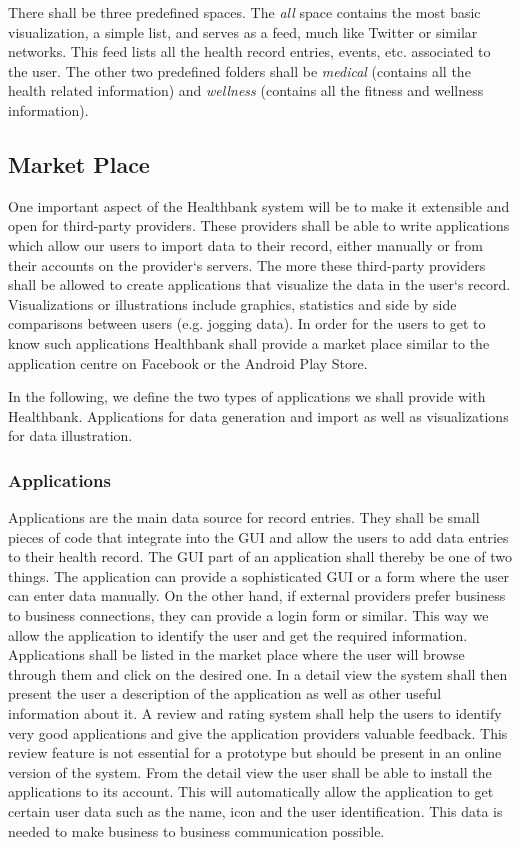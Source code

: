 There shall be three predefined spaces. The \emph{all} space contains the most basic visualization, a simple list, and serves as a feed, much like Twitter or similar networks. This feed lists all the health record entries, events, etc. associated to the user. The other two predefined folders shall be \emph{medical} (contains all the health related information) and \emph{wellness} (contains all the fitness and wellness information). 


\subsection{Market Place} 

One important aspect of the Healthbank system will be to make it extensible and open for third-party providers. These providers shall be able to write applications which allow our users to import data to their record, either manually or from their accounts on the provider`s servers. The more these third-party providers shall be allowed to create applications that visualize the data in the user`s record. Visualizations or illustrations include graphics, statistics and side by side comparisons between users (e.g. jogging data). In order for the users to get to know such applications Healthbank shall provide a market place similar to the application centre on Facebook or the Android Play Store. 

In the following, we define the two types of applications we shall provide with Healthbank. Applications for data generation and import as well as visualizations for data illustration. 

\subsubsection{Applications}

Applications are the main data source for record entries. They shall be small pieces of code that integrate into the GUI and allow the users to add data entries to their health record. The GUI part of an application shall thereby be one of two things. The application can provide a sophisticated GUI or a form where the user can enter data manually. On the other hand, if external providers prefer business to business connections, they can provide a login form or similar. This way we allow the application to identify the user and get the required information.  \newline
Applications shall be listed in the market place where the user will browse through them and click on the desired one. In a detail view the system shall then present the user a description of the application as well as other useful information about it. A review and rating system shall help the users to identify very good applications and give the application providers valuable feedback. This review feature is not essential for a prototype but should be present in an online version of the system. 
From the detail view the user shall be able to install the applications to its account. This will automatically allow the application to get certain user data such as the name, icon and the user identification. This data is needed to make business to business communication possible. 

